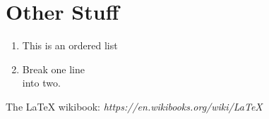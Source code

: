 \documentclass[11pt]{article} %
\begin{document}
\section{Other Stuff}
\begin{enumerate} %
	\item This is an ordered list
	\item Break one line \\ into two.
\end{enumerate}


\begin{thebibliography}{1}
	 The LaTeX wikibook: {\em https://en.wikibooks.org/wiki/LaTeX}
\end{thebibliography}
\end{document}
